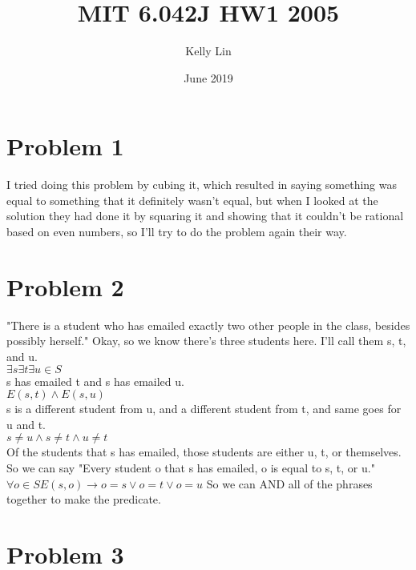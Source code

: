 \documentclass{article}
\title{MIT 6.042J HW1 2005}
\author{Kelly Lin }
\date{June 2019}
\begin{document}
\maketitle

\section{Problem 1}

I tried doing this problem by cubing it, which resulted in saying something was equal to something that it definitely wasn't equal, but when I looked at the solution they had done it by squaring it and showing that it couldn't be rational based on even numbers, so I'll try to do the problem again their way. 

\section{Problem 2}
"There is a student who has emailed exactly two other people in the class, besides possibly herself."
Okay, so we know there's three students here. I'll call them s, t, and u. 
\\
$ \exists s \exists t \exists u \in S $
\\
s has emailed t and s has emailed u.
\\
$E(s,t) \wedge E(s,u)$
\\
s is a different student from u, and a different student from t, and same goes for u and t. 
\\
$s \neq u \wedge s \neq t \wedge u \neq t$
\\
Of the students that s has emailed, those students are either u, t, or themselves. So we can say "Every student o that s has emailed, o is equal to s, t, or u."
$\forall o \in S E(s, o) \rightarrow o = s \vee o = t \vee o = u$
So we can AND all of the phrases together to make the predicate. 

\section{Problem 3}
\end{document}
